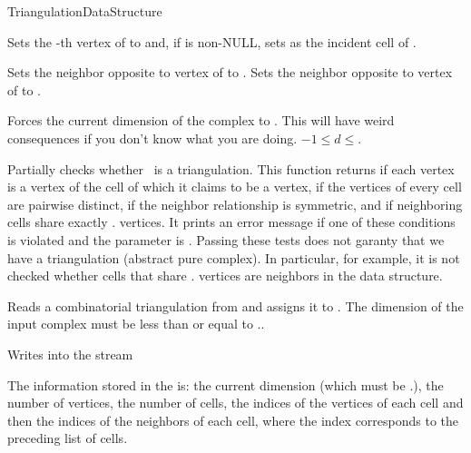 \begin{ccRefConcept}{TriangulationDataStructure}
\begin{ccAdvanced}
{Sets the -th vertex of  to  and, if  is non-NULL,
sets  as the incident cell of .}

{Sets the neighbor opposite to vertex  of   to
. Sets the neighbor opposite to vertex  of 
 to .}

 { Forces the current dimension
of the complex to . This will have weird consequences if you don't know
what you are doing. 
\ccPrecond $-1\leq d\leq$.}

\end{ccAdvanced}


{Partially checks whether \ccVar\ is a triangulation. This function
returns  if each vertex is a vertex of the cell of which it
claims to be a vertex, if the vertices of every cell are pairwise distinct,
if the neighbor relationship is symmetric, and if neighboring cells share
exactly \ccVar. vertices. It prints an error message
if one of these conditions is violated and the  parameter is
. Passing these tests does not garanty that we have a
triangulation (abstract pure
complex). In particular, for example, it is not
checked whether cells that share \ccVar. vertices
are neighbors in the data structure.}


{Reads a combinatorial triangulation from  and assigns it to
. \ccPrecond The dimension of the input complex must be less than or
equal to \ccVar..}

{Writes  into the stream }

The information stored in the  is: the current dimension (which
must be \ccc{<=} \ccVar.), the number of vertices,
the number of cells, the indices of the vertices of each cell and then the
indices of the neighbors of each cell, where the index corresponds to the
preceding list of cells.


\ccSeeAlso

\\

\end{ccRefConcept}
